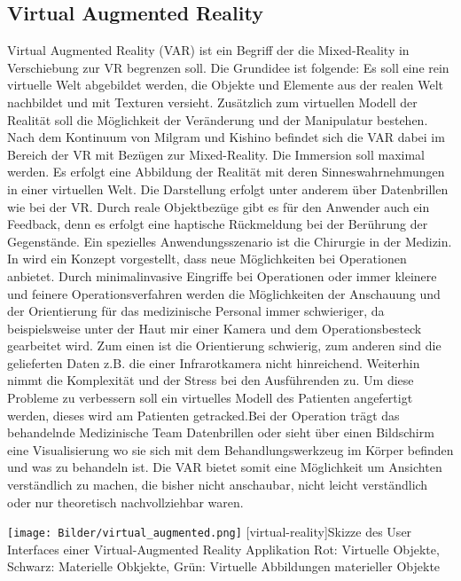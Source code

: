 \documentclass[12pt,a4paper,bibliography=totocnumbered,listof=totocnumbered]{scrartcl}
\begin{document}
\subsection{Virtual Augmented Reality}
Virtual Augmented Reality (\ac{VAR}) ist ein Begriff der die Mixed-Reality in Verschiebung zur VR begrenzen soll. Die Grundidee ist folgende: Es soll eine rein virtuelle Welt abgebildet werden, die Objekte und Elemente aus der realen Welt nachbildet und mit Texturen versieht. Zusätzlich zum virtuellen Modell der Realität soll die Möglichkeit der Veränderung und der Manipulatur bestehen. \newline
Nach dem Kontinuum von Milgram und Kishino befindet sich die VAR dabei im Bereich der VR mit Bezügen zur Mixed-Reality. Die Immersion soll maximal werden. Es erfolgt eine Abbildung der Realität mit deren Sinneswahrnehmungen in einer virtuellen Welt. Die Darstellung erfolgt unter anderem über Datenbrillen wie bei der VR. Durch reale Objektbezüge gibt es für den Anwender auch ein Feedback, denn es erfolgt eine haptische Rückmeldung bei der Berührung der Gegenstände. \newline
Ein spezielles Anwendungsszenario ist die Chirurgie in der Medizin. In \cite{OLMOS:2014aa} wird ein Konzept vorgestellt, dass neue Möglichkeiten bei Operationen anbietet. Durch minimalinvasive Eingriffe bei Operationen oder immer kleinere und feinere Operationsverfahren werden die Möglichkeiten der Anschauung und der Orientierung für das medizinische Personal immer schwieriger, da beispielsweise unter der Haut mir einer Kamera und dem Operationsbesteck gearbeitet wird. Zum einen ist die Orientierung schwierig, zum anderen sind die gelieferten Daten z.B. die einer Infrarotkamera nicht hinreichend. Weiterhin nimmt die Komplexität und der Stress bei den Ausführenden zu. Um diese Probleme zu verbessern soll ein virtuelles Modell des Patienten angefertigt werden, dieses wird am Patienten getracked.Bei der Operation trägt das behandelnde Medizinische Team Datenbrillen oder sieht über einen Bildschirm eine Visualisierung wo sie sich mit dem Behandlungswerkzeug im Körper befinden und was zu behandeln ist. \newline
Die VAR bietet somit eine Möglichkeit um Ansichten verständlich zu machen, die bisher nicht anschaubar, nicht leicht verständlich oder nur theoretisch nachvollziehbar waren.

\begin{minipage}{\linewidth}
\vspace{1em}
	\centering
	\texttt{[image: Bilder/virtual\_augmented.png]}
	[virtual-reality]{Skizze des User Interfaces einer Virtual-Augmented Reality Applikation\newline
	Rot: Virtuelle Objekte, Schwarz: Materielle Obkjekte, Grün: Virtuelle Abbildungen materieller Objekte}
	\label{fig:virtual_augmented_reality}
\vspace{1em}

\end{minipage}
\end{document}
